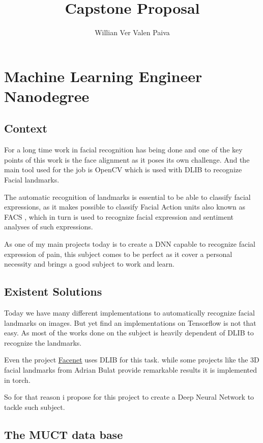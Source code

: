 \documentclass[11pt]{article}
\author{Willian Ver Valen Paiva}
\date{}
\title{Capstone Proposal}
\begin{document}
\maketitle

\section{Machine Learning Engineer Nanodegree}
\label{sec:org7abe61d}
\subsection{Context}
\label{sec:orgc08cfe2}

For a long time work in facial recognition has being done and one of the key
points of this work is the face alignment as it poses its own challenge.
And the main tool used for the job is OpenCV which is used with DLIB to
recognize Facial landmarks.

The automatic recognition of landmarks is essential to be able to classify
facial expressions, as it makes possible to classify Facial Action units also
known as FACS \cite{ekman1977facial}, which in turn is used to recognize facial
expression and sentiment analyses of such expressions.

As one of my main projects today is to create a DNN capable to recognize
facial expression of pain, this subject comes to be perfect as it cover a
personal necessity and brings a good subject to work and learn.


\subsection{Existent Solutions}
\label{sec:org56d5a6f}

Today we have many different implementations to automatically recognize
facial landmarks on images. But yet find an implementations on Tensorflow is
not that easy. As most of the works done on the subject is heavily dependent
of DLIB to recognize the landmarks.

Even the project \href{https://github.com/davidsandberg/facenet}{Facenet} \cite{Charles2013} uses DLIB for this task. while some projects like
the 3D facial landmarks \cite{bulat2017far} from Adrian Bulat provide
remarkable results it is implemented in torch.

So for that reason i propose for this project to create a Deep Neural Network to
tackle such subject.

\subsection{The MUCT data base}
\label{sec:orgebdda92}
\end{document}
